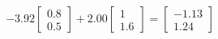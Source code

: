 \documentclass[preview]{standalone}
\begin{document}
\begin{align*}
-3.92 \begin{bmatrix} 0.8 \\ 0.5 \end{bmatrix} + 2.00 \begin{bmatrix} 1 \\ 1.6 \end{bmatrix} = \begin{bmatrix} -1.13 \\ 1.24 \end{bmatrix}
\end{align*}
\end{document}
